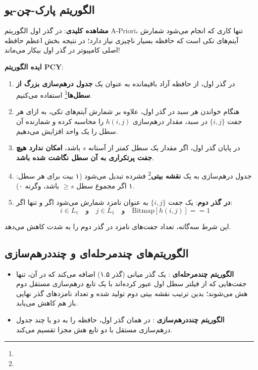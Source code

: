 \subsection{الگوریتم پارک-چن-یو \texorpdfstring{}{(PCY)}}
\textbf{مشاهده کلیدی}: در گذر اول الگوریتم A-Priori، تنها کاری که انجام می‌شود شمارش آیتم‌های تکی است که حافظه بسیار ناچیزی نیاز دارد؛ در نتیجه بخش اعظم حافظه اصلی کامپیوتر در گذر اول بیکار می‌ماند!

\textbf{ایده الگوریتم PCY}:
\begin{enumerate}
    \item در گذر اول، از حافظه آزاد باقیمانده به عنوان یک \textbf{جدول درهم‌سازی بزرگ از سطل‌ها}\footnote{} استفاده می‌کنیم.
    \item هنگام خواندن هر سبد در گذر اول، علاوه بر شمارش آیتم‌های تکی، به ازای هر جفت $\{i, j\}$ در سبد، مقدار درهم‌سازی $h(i, j)$ را محاسبه کرده و شمارنده آن سطل را یک واحد افزایش می‌دهیم.
    \item در پایان گذر اول، اگر مقدار یک سطل کمتر از آستانه $s$ باشد، \textbf{امکان ندارد هیچ جفت پرتکراری به آن سطل نگاشت شده باشد}.
    \item جدول درهم‌سازی به یک \textbf{نقشه بیتی}\footnote{} فشرده تبدیل می‌شود (۱ بیت برای هر سطل: ۱ اگر مجموع سطل $\ge s$ باشد، وگرنه ۰).
    \item \textbf{در گذر دوم}: یک جفت $\{i, j\}$ به عنوان نامزد شمارش می‌شود اگر و تنها اگر:
    \begin{equation}
    i \in L_1 \quad \text{و} \quad j \in L_1 \quad \text{و} \quad \text{Bitmap}[h(i, j)] == 1
    \end{equation}
\end{enumerate}
این شرط سه‌گانه، تعداد جفت‌های نامزد در گذر دوم را به شدت کاهش می‌دهد.

\subsection{الگوریتم‌های چندمرحله‌ای و چنددرهم‌سازی \texorpdfstring{}{(Multistage \& Multihash)}}
\begin{itemize}
    \item \textbf{الگوریتم چندمرحله‌ای }: یک گذر میانی (گذر ۱.۵) اضافه می‌کند که در آن، تنها جفت‌هایی که از فیلتر سطل اول عبور کرده‌اند با یک تابع درهم‌سازی مستقل دوم هش می‌شوند؛ بدین ترتیب نقشه بیتی دوم تولید شده و تعداد نامزدهای گذر نهایی باز هم کاهش می‌یابد.
    \item \textbf{الگوریتم چنددرهم‌سازی }: در همان گذر اول، حافظه را به دو یا چند جدول درهم‌سازی مستقل با دو تابع هش مجزا تقسیم می‌کند.
\end{itemize}

